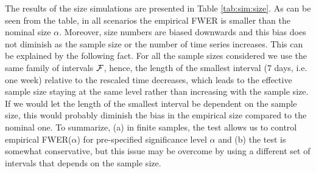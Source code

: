 \documentclass[a4paper,12pt]{article}
\numberwithin{equation}{section}
\begin{document}
The results of the size simulations are presented in Table \ref{tab:sim:size}. As can be seen from the table, in all scenarios the empirical FWER is smaller than the nominal size $\alpha$. Moreover, size numbers are biased downwards and this bias does not diminish as the sample size or the number of time series increases. This can be explained by the following fact. For all the sample sizes considered we use the same family of intervals $\mathcal{F}$, hence, the length of the smallest interval ($7$ days, i.e. one week) relative to the rescaled time decreases, which leads to the effective sample size staying at the same level rather than increasing with the sample size. If we would let the length of the smallest interval be dependent on the sample size, this would probably diminish the bias in the empirical size compared to the nominal one. To summarize, (a) in finite samples, the test allows us to control empirical FWER($\alpha$) for pre-specified significance level $\alpha$ and (b) the test is somewhat conservative, but this issue may be overcome by using a different set of intervals that depends on the sample size.
\end{document}
